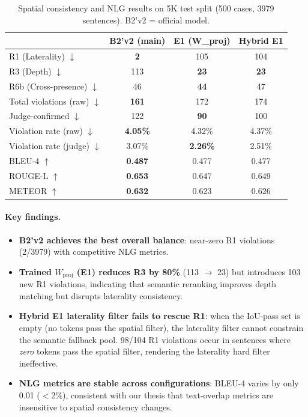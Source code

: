\documentclass[11pt,a4paper]{article}
\begin{document}
\begin{table}[H]
\centering\small
\caption{Spatial consistency and NLG results on 5K test split (500 cases, 3979 sentences). B2'v2 = official model.}
\begin{tabular}{lccc}
\toprule
& \textbf{B2'v2} (main) & E1 (W\_proj) & Hybrid E1 \\
\midrule
R1 (Laterality) $\downarrow$ & \textbf{2} & 105 & 104 \\
R3 (Depth) $\downarrow$ & 113 & \textbf{23} & \textbf{23} \\
R6b (Cross-presence) $\downarrow$ & 46 & \textbf{44} & 47 \\
Total violations (raw) $\downarrow$ & \textbf{161} & 172 & 174 \\
Judge-confirmed $\downarrow$ & 122 & \textbf{90} & 100 \\
\midrule
Violation rate (raw) $\downarrow$ & \textbf{4.05\%} & 4.32\% & 4.37\% \\
Violation rate (judge) $\downarrow$ & 3.07\% & \textbf{2.26\%} & 2.51\% \\
\midrule
BLEU-4 $\uparrow$ & \textbf{0.487} & 0.477 & 0.477 \\
ROUGE-L $\uparrow$ & \textbf{0.653} & 0.647 & 0.649 \\
METEOR $\uparrow$ & \textbf{0.632} & 0.623 & 0.626 \\
\bottomrule
\end{tabular}
\label{tab:main_results}
\end{table}

\paragraph{Key findings.}
\begin{itemize}[nosep]
\item \textbf{B2'v2 achieves the best overall balance}: near-zero R1 violations (2/3979) with competitive NLG metrics.
\item \textbf{Trained $W_{\mathrm{proj}}$ (E1) reduces R3 by 80\%} (113 $\to$ 23) but introduces 103 new R1 violations, indicating that semantic reranking improves depth matching but disrupts laterality consistency.
\item \textbf{Hybrid E1 laterality filter fails to rescue R1}: when the IoU-pass set is empty (no tokens pass the spatial filter), the laterality filter cannot constrain the semantic fallback pool. 98/104 R1 violations occur in sentences where \emph{zero} tokens pass the spatial filter, rendering the laterality hard filter ineffective.
\item \textbf{NLG metrics are stable across configurations}: BLEU-4 varies by only 0.01 ($<$2\%), consistent with our thesis that text-overlap metrics are insensitive to spatial consistency changes.
\end{itemize}
\end{document}
